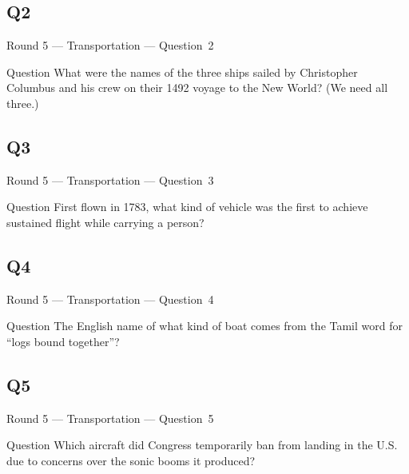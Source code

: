 \documentclass[11pt]{beamer}
\begin{document}
\subsection*{Q2}
\begin{frame}[t]{Round 5 --- Transportation --- \mbox{Question 2}}
\vspace{-0.5em}
\begin{block}{Question}
What were the names of the three ships sailed by Christopher Columbus and his crew on their 1492 voyage to the New World? (We need all three.)
\end{block}
\end{frame}
\subsection*{Q3}
\begin{frame}[t]{Round 5 --- Transportation --- \mbox{Question 3}}
\vspace{-0.5em}
\begin{block}{Question}
First flown in 1783, what kind of vehicle was the first to achieve sustained flight while carrying a person?
\end{block}
\end{frame}
\subsection*{Q4}
\begin{frame}[t]{Round 5 --- Transportation --- \mbox{Question 4}}
\vspace{-0.5em}
\begin{block}{Question}
The English name of what kind of boat comes from the Tamil word for ``logs bound together''?
\end{block}
\end{frame}
\subsection*{Q5}
\begin{frame}[t]{Round 5 --- Transportation --- \mbox{Question 5}}
\vspace{-0.5em}
\begin{block}{Question}
Which aircraft did Congress temporarily ban from landing in the U.S. due to concerns over the sonic booms it produced?
\end{block}
\end{frame}
\end{document}
